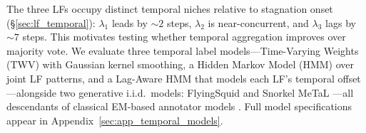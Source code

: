 The three LFs occupy distinct temporal niches relative to stagnation onset (\S\ref{sec:lf_temporal}): $\lambda_1$ leads by ${\sim}2$ steps, $\lambda_2$ is near-concurrent, and $\lambda_3$ lags by ${\sim}7$ steps.
This motivates testing whether temporal aggregation improves over majority vote.
We evaluate three temporal label models---Time-Varying Weights (TWV) with Gaussian kernel smoothing, a Hidden Markov Model (HMM) \citep{safranchik2020linkedhmm} over joint LF patterns, and a Lag-Aware HMM that models each LF's temporal offset---alongside two generative i.i.d.\ models: FlyingSquid \citep{fu2020flyingsquid} and Snorkel MeTaL \citep{ratner2019snorkelmetal}---all descendants of classical EM-based annotator models \citep{dawid1979em}.
Full model specifications appear in Appendix~\ref{sec:app_temporal_models}.